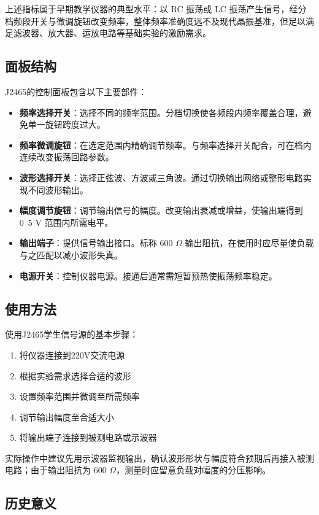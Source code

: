 上述指标属于早期教学仪器的典型水平：以 RC 振荡或 LC 振荡产生信号，经分档频段开关与微调旋钮改变频率，整体频率准确度远不及现代晶振基准，但足以满足滤波器、放大器、运放电路等基础实验的激励需求。

\subsection{面板结构}

J2465的控制面板包含以下主要部件：

\begin{itemize}
    \item \textbf{频率选择开关}：选择不同的频率范围。分档切换使各频段内频率覆盖合理，避免单一旋钮跨度过大。
    \item \textbf{频率微调旋钮}：在选定范围内精确调节频率。与频率选择开关配合，可在档内连续改变振荡回路参数。
    \item \textbf{波形选择开关}：选择正弦波、方波或三角波。通过切换输出网络或整形电路实现不同波形输出。
    \item \textbf{幅度调节旋钮}：调节输出信号的幅度。改变输出衰减或增益，使输出端得到 0~5 V 范围内所需电平。
    \item \textbf{输出端子}：提供信号输出接口。标称 600 $\Omega$ 输出阻抗，在使用时应尽量使负载与之匹配以减小波形失真。
    \item \textbf{电源开关}：控制仪器电源。接通后通常需短暂预热使振荡频率稳定。
\end{itemize}

\subsection{使用方法}

使用J2465学生信号源的基本步骤：

\begin{enumerate}
    \item 将仪器连接到220V交流电源
    \item 根据实验需求选择合适的波形
    \item 设置频率范围并微调至所需频率
    \item 调节输出幅度至合适大小
    \item 将输出端子连接到被测电路或示波器
\end{enumerate}

实际操作中建议先用示波器监视输出，确认波形形状与幅度符合预期后再接入被测电路；由于输出阻抗为 600 $\Omega$，测量时应留意负载对幅度的分压影响。

\subsection{历史意义}


